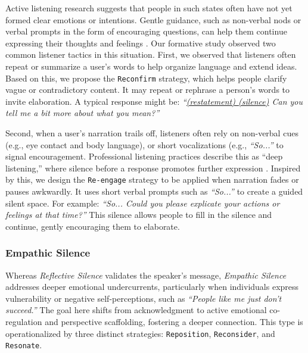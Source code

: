 Active listening research suggests that people in such states often have not yet formed clear emotions or intentions. Gentle guidance, such as non-verbal nods or verbal prompts in the form of encouraging questions, can help them continue expressing their thoughts and feelings \cite{glenn2024so, Mc2008Teaching}. Our formative study observed two common listener tactics in this situation.
First, we observed that listeners often repeat or summarize a user’s words to help organize language and extend ideas. Based on this, we propose the \texttt{Reconfirm} strategy, which helps people clarify vague or contradictory content. It may repeat or rephrase a person's words to invite elaboration. A typical response might be: \textit{``\underline{(restatement) (silence)} Can you tell me a bit more about what you mean?''} 

Second, when a user's narration trails off, listeners often rely on non-verbal cues (e.g., eye contact and body language), or short vocalizations (e.g., \textit{``So...''} to signal encouragement. Professional listening practices describe this as ``deep listening,'' where silence before a response promotes further expression \cite{epstein2023don}. Inspired by this, we design the \texttt{Re-engage} strategy to be applied when narration fades or pauses awkwardly. It uses short verbal prompts such as \textit{``So...''} to create a guided silent space. For example: \textit{``So... Could you please explicate your actions or feelings at that time?''} This silence allows people to fill in the silence and continue, gently encouraging them to elaborate.



\subsubsection{Empathic Silence}

Whereas \emph{Reflective Silence} validates the speaker's message, \emph{Empathic Silence} addresses deeper emotional undercurrents, particularly when individuals express vulnerability or negative self-perceptions, such as \textit{``People like me just don't succeed.''} The goal here shifts from acknowledgment to active emotional co-regulation and perspective scaffolding, fostering a deeper connection. This type is operationalized by three distinct strategies: \texttt{Reposition}, \texttt{Reconsider}, and \texttt{Resonate}.

